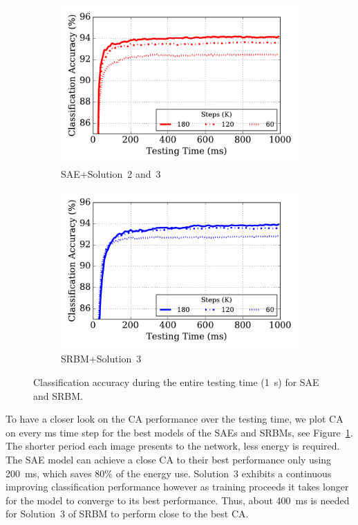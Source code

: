 \begin{figure}
	\centering
	\begin{subfigure}[t]{0.45\textwidth}
		\includegraphics[width=\textwidth]{pics_sdlm/43_MNIST_SAE_all/latency.pdf}
		\caption{SAE+Solution~2 and~3}
	\end{subfigure}
	\begin{subfigure}[t]{0.45\textwidth}
		\includegraphics[width=\textwidth]{pics_sdlm/51_MNIST_SRBM_teach/latency.pdf}
		\caption{SRBM+Solution~3}
	\end{subfigure}
	\caption{Classification accuracy during the entire testing time (1~s) for SAE and SRBM.}
	\label{fig:latency}
\end{figure}

To have a closer look on the CA performance over the testing time, we plot CA on every ms time step for the best models of the SAEs and SRBMs, see Figure~\ref{fig:latency}.
The shorter period each image presents to the network, less energy is required.
The SAE model can achieve a close CA to their best performance only using 200~ms, which saves 80\% of the energy use.
Solution~3 exhibits a continuous improving classification performance however as training proceeds it takes longer for the model to converge to its best performance.
Thus, about 400~ms is needed for Solution~3 of SRBM to perform close to the best CA.

